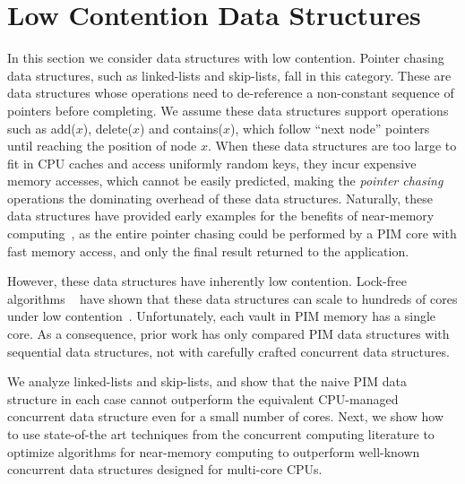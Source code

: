 
\section{Low Contention Data Structures}
\label{section:pointer_chasing}

In this section we consider data structures with low contention. 
Pointer chasing data structures, 
such as linked-lists and skip-lists, fall in this category.  
These are data structures whose operations  
need to de-reference a non-constant sequence of pointers before completing. 
We assume these data structures support operations 
such as add($x$), delete($x$) and contains($x$), which follow ``next node'' pointers until 
reaching the position of node $x$.
When these data structures are too large to fit in CPU caches 
and access uniformly random keys,
they incur expensive memory accesses, which cannot be easily predicted, 
making the \emph{pointer chasing} operations the dominating overhead of these data structures.
Naturally, these data structures have provided early examples for the benefits of near-memory 
computing~\cite{hsieh2016accelerating, Hashemi:2016}, 
as the entire pointer chasing could be performed by a PIM core with fast memory access, 
and only the final result returned to the application. 

However, these data structures have inherently low contention. 
Lock-free algorithms
~\cite{practicallf, skiplists-concpugh, valois, Herlihy08}
have shown that these data structures can scale to hundreds of cores under low contention~\cite{nodereplication}. Unfortunately, each vault in 
PIM memory has a single core. 
As a consequence, prior work has only compared PIM data structures with sequential data structures, 
not with carefully crafted concurrent data structures.

We analyze linked-lists and skip-lists, and show that the naive PIM data structure in each case cannot 
outperform the equivalent CPU-managed concurrent data structure even for a small number of cores. 
Next, we show how to use state-of-the art techniques from the concurrent computing literature to 
optimize algorithms for near-memory computing to outperform well-known concurrent data 
structures designed for multi-core CPUs. 

